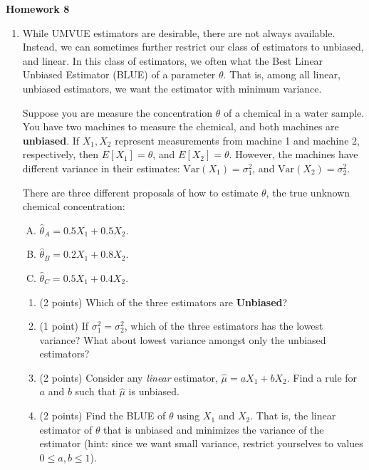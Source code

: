 \documentclass[10pt,twoside]{article}\usepackage[]{graphicx}\usepackage[dvipsnames,svgnames,table]{xcolor}
\newcommand{\Var}{\text{Var}}
\begin{document}
\begin{flushright}
\begin{minipage}{.33\textwidth}
\rightline{\today}
\end{minipage}
\end{flushright}

\begin{center}
{\large{\textbf{Homework 8}}}
\end{center}

\begin{enumerate}
  \item While UMVUE estimators are desirable, there are not always available.
  Instead, we can sometimes further restrict our class of estimators to unbiased, and linear.
  In this class of estimators, we often what the Best Linear Unbiased Estimator (BLUE) of a parameter $\theta$.
  That is, among all linear, unbiased estimators, we want the estimator with minimum variance.

  Suppose you are measure the concentration $\theta$ of a chemical in a water sample.
  You have two machines to measure the chemical, and both machines are \textbf{unbiased}.
  If $X_1, X_2$ represent measurements from machine 1 and machine 2, respectively, then $E[X_1] = \theta$, and $E[X_2] = \theta$.
  However, the machines have different variance in their estimates: $\Var(X_1) = \sigma^2_1$, and $\Var(X_2) = \sigma^2_2$.

  There are three different proposals of how to estimate $\theta$, the true unknown chemical concentration:
  \begin{enumerate}[(A)]
    \item $\hat{\theta}_A = 0.5 X_1 + 0.5 X_2$.
    \item $\hat{\theta}_B = 0.2 X_1 + 0.8 X_2$.
    \item $\hat{\theta}_C = 0.5 X_1 + 0.4 X_2$.
  \end{enumerate}

\begin{enumerate}
  \item (2 points) Which of the three estimators are \textbf{Unbiased}?
  \item (1 point) If $\sigma^2_1 = \sigma^2_2$, which of the three estimators has the lowest variance? What about lowest variance amongst only the unbiased estimators?
  \item (2 points) Consider any \emph{linear} estimator, $\hat{\mu} = aX_1 + bX_2$. Find a rule for $a$ and $b$ such that $\hat{\mu}$ is unbiased.
  \item (2 points) Find the BLUE of $\theta$ using $X_1$ and $X_2$. That is, the linear estimator of $\theta$ that is unbiased and minimizes the variance of the estimator (hint: since we want small variance, restrict yourselves to values $0 \leq a, b \leq 1$).
\end{enumerate}


\end{enumerate}
\end{document}
